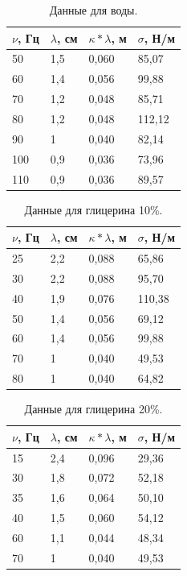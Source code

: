 \documentclass[a4paper,14pt]{article}
\begin{document}
\begin{table}[!ht]
    \centering
    \begin{tabular}{|l|l|l|l|}
    \hline
        $\nu$, Гц & $\lambda$, см & $\kappa*\lambda$, м & $\sigma$, Н/м \\ \hline
        50 & 1,5 & 0,060 & 85,07 \\ \hline
        60 & 1,4 & 0,056 & 99,88 \\ \hline
        70 & 1,2 & 0,048 & 85,71 \\ \hline
        80 & 1,2 & 0,048 & 112,12 \\ \hline
        90 & 1 & 0,040 & 82,14 \\ \hline
        100 & 0,9 & 0,036 & 73,96 \\ \hline
        110 & 0,9 & 0,036 & 89,57 \\ \hline
    \end{tabular}
    \caption{Данные для воды.}
\end{table}

\begin{table}[!ht]
    \centering
    \begin{tabular}{|l|l|l|l|}
    \hline
        $\nu$, Гц & $\lambda$, см & $\kappa*\lambda$, м & $\sigma$, Н/м \\ \hline
        25 & 2,2 & 0,088 & 65,86 \\ \hline
        30 & 2,2 & 0,088 & 95,70 \\ \hline
        40 & 1,9 & 0,076 & 110,38 \\ \hline
        50 & 1,4 & 0,056 & 69,12 \\ \hline
        60 & 1,4 & 0,056 & 99,88 \\ \hline
        70 & 1 & 0,040 & 49,53 \\ \hline
        80 & 1 & 0,040 & 64,82 \\ \hline
    \end{tabular}
    \caption{Данные для глицерина 10\%.}
\end{table}

\begin{table}[!ht]
    \centering
    \begin{tabular}{|l|l|l|l|}
    \hline
        $\nu$, Гц & $\lambda$, см & $\kappa*\lambda$, м & $\sigma$, Н/м \\ \hline
        15 & 2,4 & 0,096 & 29,36 \\ \hline
        30 & 1,8 & 0,072 & 52,18 \\ \hline
        35 & 1,6 & 0,064 & 50,10 \\ \hline
        40 & 1,5 & 0,060 & 54,12 \\ \hline
        60 & 1,1 & 0,044 & 48,34 \\ \hline
        70 & 1 & 0,040 & 49,53 \\ \hline
    \end{tabular}
    \caption{Данные для глицерина 20\%.}
\end{table}
\end{document}
